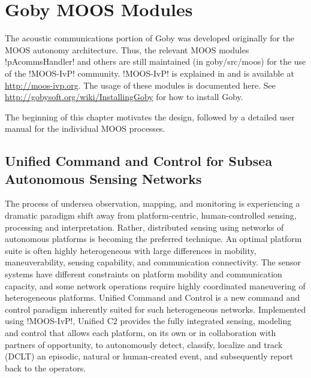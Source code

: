 \chapter{Goby MOOS Modules}\label{chap:MOOS}
\MakeShortVerb{\!} %

The acoustic communications portion of Goby was developed originally for the MOOS autonomy architecture. Thus, the relevant MOOS modules !pAcommsHandler! and others are still maintained (in goby/src/moos) for the use of the !MOOS-IvP! community. !MOOS-IvP! is explained in \cite{moos-ivp-jfr} and is available at \url{http://moos-ivp.org}. The usage of these modules is documented here. See \url{http://gobysoft.org/wiki/InstallingGoby} for how to install Goby.

The beginning of this chapter motivates the design, followed by a detailed user manual for the individual MOOS processes.

\section{Unified Command and Control for Subsea Autonomous Sensing Networks}

The process of undersea observation, mapping, and monitoring is experiencing a dramatic
paradigm shift away from platform-centric, human-controlled sensing,
processing and interpretation. Rather, distributed sensing
using networks of autonomous platforms is becoming the preferred technique.
An optimal platform suite is often highly heterogeneous with large differences in mobility,
maneuverability, sensing capability, and communication connectivity.  The
sensor systems have different constraints on platform mobility and
communication capacity, and some network operations require highly
coordinated maneuvering of heterogeneous platforms. Unified Command and Control \cite{unified_c2} is a new command and control paradigm inherently suited for such heterogeneous networks. Implemented using
!MOOS-IvP!, Unified C2 provides the fully integrated sensing,
modeling and control that allows each platform, on its own or in
collaboration with partners of opportunity, to autonomously detect,
classify, localize and track (DCLT) an episodic, natural or human-created event, and
subsequently report back to the operators.

